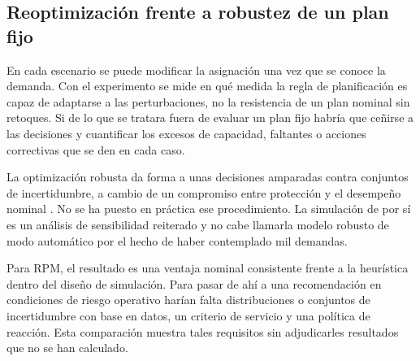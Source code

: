 \subsection{Reoptimización frente a robustez de un plan fijo}
En cada escenario se puede modificar la asignación una vez que se conoce la demanda. Con el experimento se mide en qué medida la regla de planificación es capaz de adaptarse a las perturbaciones, no la resistencia de un plan nominal sin retoques. Si de lo que se tratara fuera de evaluar un plan fijo habría que ceñirse a las decisiones y cuantificar los excesos de capacidad, faltantes o acciones correctivas que se den en cada caso.

La optimización robusta da forma a unas decisiones amparadas contra conjuntos de incertidumbre, a cambio de un compromiso entre protección y el desempeño nominal \cite{bertsimas}. No se ha puesto en práctica ese procedimiento. La simulación de por sí es un análisis de sensibilidad reiterado y no cabe llamarla modelo robusto de modo automático por el hecho de haber contemplado mil demandas.

Para RPM, el resultado es una ventaja nominal consistente frente a la heurística dentro del diseño de simulación. Para pasar de ahí a una recomendación en condiciones de riesgo operativo harían falta distribuciones o conjuntos de incertidumbre con base en datos, un criterio de servicio y una política de reacción. Esta comparación muestra tales requisitos sin adjudicarles resultados que no se han calculado.
